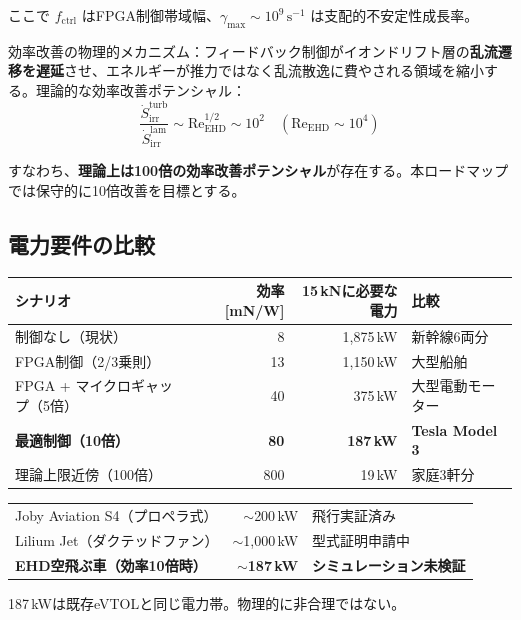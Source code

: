 \documentclass[12pt,a4paper]{ltjsarticle}
\begin{document}
ここで $f_{\mathrm{ctrl}}$ はFPGA制御帯域幅、$\gamma_{\max} \sim 10^9\,\mathrm{s}^{-1}$ は支配的不安定性成長率。

効率改善の物理的メカニズム：フィードバック制御がイオンドリフト層の\textbf{乱流遷移を遅延}させ、エネルギーが推力ではなく乱流散逸に費やされる領域を縮小する。理論的な効率改善ポテンシャル：
\begin{equation}
  \frac{\dot{S}_{\mathrm{irr}}^{\mathrm{turb}}}{\dot{S}_{\mathrm{irr}}^{\mathrm{lam}}}
  \sim \mathrm{Re}_{\mathrm{EHD}}^{1/2}
  \sim 10^2 \quad (\mathrm{Re}_{\mathrm{EHD}} \sim 10^4)
\end{equation}

すなわち、\textbf{理論上は100倍の効率改善ポテンシャル}が存在する。本ロードマップでは保守的に10倍改善を目標とする。

\subsection{電力要件の比較}

\begin{center}
\sffamily\small
\begin{tabular}{@{}lrrl@{}}
\toprule
\textbf{シナリオ} & \textbf{効率 [mN/W]} & \textbf{15\,kNに必要な電力} & \textbf{比較} \\
\midrule
制御なし（現状） & 8 & 1,875\,kW & 新幹線6両分 \\
FPGA制御（2/3乗則） & 13 & 1,150\,kW & 大型船舶 \\
FPGA + マイクロギャップ（5倍） & 40 & 375\,kW & 大型電動モーター \\
\textbf{最適制御（10倍）} & \textbf{80} & \textbf{187\,kW} & \textbf{Tesla Model 3} \\
理論上限近傍（100倍） & 800 & 19\,kW & 家庭3軒分 \\
\bottomrule
\end{tabular}
\end{center}

\begin{infobox}[既存eVTOLとの電力比較]
\sffamily
\begin{tabular}{@{}lrl@{}}
Joby Aviation S4（プロペラ式）& $\sim$200\,kW & 飛行実証済み \\
Lilium Jet（ダクテッドファン）& $\sim$1,000\,kW & 型式証明申請中 \\
\textbf{EHD空飛ぶ車（効率10倍時）} & \textbf{$\sim$187\,kW} & \textbf{シミュレーション未検証} \\
\end{tabular}

\vspace{4pt}
187\,kWは既存eVTOLと同じ電力帯。物理的に非合理ではない。
\end{infobox}
\end{document}
